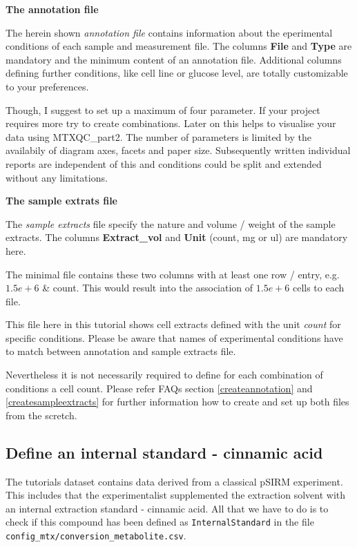 \documentclass[]{book}
\begin{document}
\textbf{The annotation file}

The herein shown \emph{annotation file} contains information about the eperimental conditions of each sample and measurement file. The columns \textbf{File} and \textbf{Type} are mandatory and the minimum content of an annotation file. Additional columns defining further conditions, like cell line or glucose level, are totally customizable to your preferences.

Though, I suggest to set up a maximum of four parameter. If your project requires more try to create combinations. Later on this helps to visualise your data using MTXQC\_part2. The number of parameters is limited by the availabily of diagram axes, facets and paper size. Subsequently written individual reports are independent of this and conditions could be split and extended without any limitations.

\textbf{The sample extrats file}

The \emph{sample extracts} file specify the nature and volume / weight of the sample extracts. The columns \textbf{Extract\_vol} and \textbf{Unit} (count, mg or ul) are mandatory here.

The minimal file contains these two columns with at least one row / entry, e.g. \(1.5e+6\) \& count. This would result into the association of \(1.5e+6\) cells to each file.

This file here in this tutorial shows cell extracts defined with the unit \emph{count} for specific conditions. Please be aware that names of experimental conditions have to match between annotation and sample extracts file.

Nevertheless it is not necessarily required to define for each combination of conditions a cell count. Please refer FAQs section \ref{createannotation} and \ref{createsampleextracts} for further information how to create and set up both files from the scretch.

\hypertarget{define-an-internal-standard---cinnamic-acid}{%
\subsection{Define an internal standard - cinnamic acid}\label{define-an-internal-standard---cinnamic-acid}}

The tutorials dataset contains data derived from a classical pSIRM experiment. This includes that the experimentalist supplemented the extraction solvent with an internal extraction standard - cinnamic acid.
All that we have to do is to check if this compound has been defined as \texttt{InternalStandard} in the file \texttt{config\_mtx/conversion\_metabolite.csv}.
\end{document}
